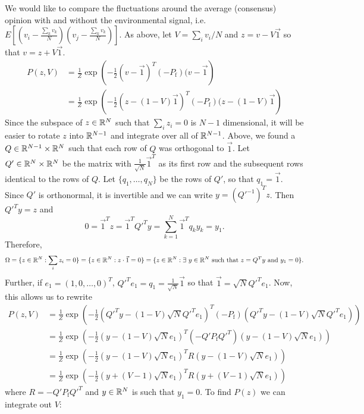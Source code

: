 \documentclass{article}
\begin{document}
We would like to compare the fluctuations around the average (consensus) opinion with and without the environmental signal, i.e. $E[(v_i-\frac{\sum_kv_k}{N})(v_j-\frac{\sum_kv_k}{N})]$. As above, let $V=\sum_iv_i/N$ and $z=v-V\vec{1}$ so that $v=z+V\vec{1}$. 
\begin{align*}
P(z,V)&=\frac{1}{Z}\exp\left(-\frac{1}{2}(v-\vec{1})^T(-P_\text{f})(v-\vec{1}\right)
\\&=\frac{1}{Z}\exp\left(-\frac{1}{2}(z-(1-V)\vec{1})^T(-P_\text{f})(z-(1-V)\vec{1}\right)
\end{align*}
Since the subspace of $z\in{\mathbb{R}}^N$ such that $\sum_iz_i=0$ is $N-1$ dimensional, it will be easier to rotate $z$ into ${\mathbb{R}}^{N-1}$ and integrate over all of ${\mathbb{R}}^{N-1}$. Above, we found a $Q\in{\mathbb{R}}^{N-1}\times{\mathbb{R}}^N$ such that each row of $Q$ was orthogonal to $\vec{1}$. Let $Q'\in{\mathbb{R}}^N\times{\mathbb{R}}^N$ be the matrix with $\frac{1}{\sqrt{N}}\vec{1}^T$ as its first row and the subsequent rows identical to the rows of $Q$. Let $\{q_1,\dots,q_N\}$ be the rows of $Q'$, so that $q_1=\vec{1}$. Since $Q'$ is orthonormal, it is invertible and we can write $y=(Q'^{-1})^Tz$. Then $Q'^Ty=z$ and $$0=\vec{1}^Tz=\vec{1}^TQ'^Ty=\sum_{k=1}^N\vec{1}^Tq_ky_k=y_1.$$ 
Therefore, 
$$\Omega=\{z\in{\mathbb{R}}^N:\sum_iz_i=0\}=\{z\in{\mathbb{R}}^N:z\cdot\vec{1}=0\}=\{z\in{\mathbb{R}}^N:\exists \ y\in{\mathbb{R}}^N \text{ such that } z=Q^Ty \text{ and } y_1=0\}.$$
Further, if $e_1=(1,0,\dots,0)^T$, $Q'^Te_1=q_1=\frac{1}{\sqrt{N}}\vec{1}$ so that $\vec{1}=\sqrt{N}Q'^Te_1$.
Now, this allows us to rewrite
\begin{align*}
P(z,V)&=\frac{1}{Z}\exp\left(-\frac{1}{2}(Q'^Ty-(1-V)\sqrt{N}Q'^Te_1)^T(-P_\text{f})(Q'^Ty-(1-V)\sqrt{N}Q'^Te_1)\right)
\\&=\frac{1}{Z}\exp\left(-\frac{1}{2}(y-(1-V)\sqrt{N}e_1)^T(-Q'P_\text{f}Q'^T)(y-(1-V)\sqrt{N}e_1)\right)
\\&=\frac{1}{Z}\exp\left(-\frac{1}{2}(y-(1-V)\sqrt{N}e_1)^TR(y-(1-V)\sqrt{N}e_1)\right)
\\&=\frac{1}{Z}\exp\left(-\frac{1}{2}(y+(V-1)\sqrt{N}e_1)^TR(y+(V-1)\sqrt{N}e_1)\right)
\end{align*}
where $R=-Q'P_\text{f}Q'^T$ and $y\in{\mathbb{R}}^N$ is such that $y_1=0$. To find $P(z)$ we can integrate out $V$:
\end{document}

